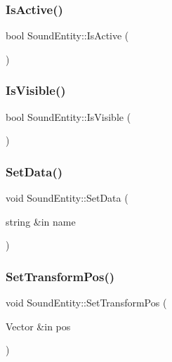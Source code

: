 \hypertarget{class_sound_entity_a88497c33c80efd65174cd4babd6ee1e7}{}\label{class_sound_entity_a88497c33c80efd65174cd4babd6ee1e7} 
\subsubsection{\texorpdfstring{Is\+Active()}{IsActive()}}
{\footnotesize\ttfamily bool Sound\+Entity\+::\+Is\+Active (\begin{DoxyParamCaption}{ }\end{DoxyParamCaption})}

\hypertarget{class_sound_entity_a7d967b71a7b702571fe0a3701ad8a6b7}{}\label{class_sound_entity_a7d967b71a7b702571fe0a3701ad8a6b7} 
\subsubsection{\texorpdfstring{Is\+Visible()}{IsVisible()}}
{\footnotesize\ttfamily bool Sound\+Entity\+::\+Is\+Visible (\begin{DoxyParamCaption}{ }\end{DoxyParamCaption})}

\hypertarget{class_sound_entity_a1916c9261ea80e9cbc88bcc535417c3b}{}\label{class_sound_entity_a1916c9261ea80e9cbc88bcc535417c3b} 
\subsubsection{\texorpdfstring{Set\+Data()}{SetData()}}
{\footnotesize\ttfamily void Sound\+Entity\+::\+Set\+Data (\begin{DoxyParamCaption}\item[{string \&in}]{name }\end{DoxyParamCaption})}

\hypertarget{class_sound_entity_a47f93f009ae90659d2754d1745f9be29}{}\label{class_sound_entity_a47f93f009ae90659d2754d1745f9be29} 
\subsubsection{\texorpdfstring{Set\+Transform\+Pos()}{SetTransformPos()}}
{\footnotesize\ttfamily void Sound\+Entity\+::\+Set\+Transform\+Pos (\begin{DoxyParamCaption}\item[{Vector \&in}]{pos }\end{DoxyParamCaption})}

